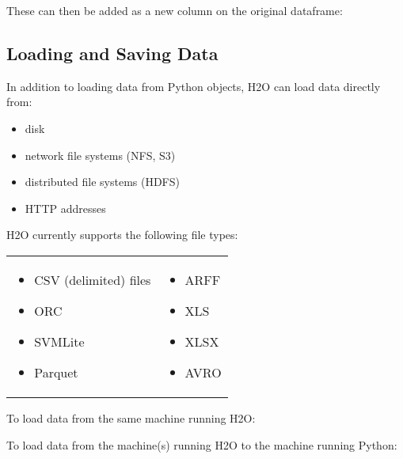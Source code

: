 {

These can then be added as a new column on the original dataframe:


\subsection{Loading and Saving Data}
In addition to loading data from Python objects, H2O can load data directly from:
\begin{itemize}
\item disk
\item network file systems (NFS, S3)
\item distributed file systems (HDFS)
\item HTTP addresses
\end{itemize}

 H2O currently supports the following file types:

\begin{frame}%

\begin{tabular}{p{5.5cm}p{5.5cm}}

\begin{itemize}
\item CSV (delimited) files
\item ORC
\item SVMLite
\item Parquet
\end{itemize} &
\begin{itemize}
\item ARFF
\item XLS
\item XLSX 
\item AVRO
\end{itemize}
\end{tabular}
\end{frame}

To load data from the same machine running H2O:


To load data from the machine(s) running H2O to the machine running Python:


}
